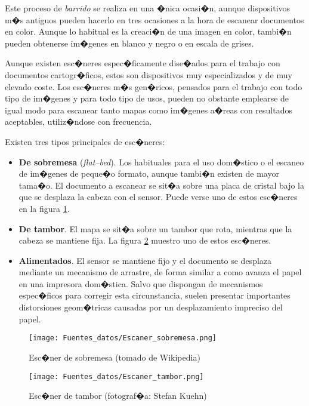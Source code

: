 Este proceso de \emph{barrido} se realiza en una �nica ocasi�n, aunque dispositivos m�s antiguos pueden hacerlo en tres ocasiones a la hora de escanear documentos en color. Aunque lo habitual es la creaci�n de una imagen en color, tambi�n  pueden obtenerse im�genes en blanco y negro o en escala de grises.

Aunque existen esc�neres espec�ficamente dise�ados para el trabajo con documentos cartogr�ficos, estos son dispositivos muy especializados y de muy elevado coste. Los esc�neres m�s gen�ricos, pensados para el trabajo con todo tipo de im�genes y para todo tipo de usos, pueden no obstante emplearse de igual modo para escanear tanto mapas como im�genes a�reas con resultados aceptables, utiliz�ndose con frecuencia.

Existen tres tipos principales de esc�neres:

\begin{itemize}
	\item \textbf{De sobremesa} (\emph{flat--bed}). Los habituales para el uso dom�stico o el escaneo de im�genes de peque�o formato, aunque tambi�n existen de mayor tama�o. El documento a escanear se sit�a sobre una placa de cristal bajo la que se desplaza la cabeza con el sensor. Puede verse uno de estos esc�neres en la figura \ref{Fig:Escaner_sobremesa}.
	\item \textbf{De tambor}. El mapa se sit�a sobre un tambor que rota, mientras que la cabeza se mantiene fija. La figura \ref{Fig:Escaner_tambor} muestro uno de estos esc�neres.
	\item \textbf{Alimentados}. El sensor se mantiene fijo y el documento se desplaza mediante un mecanismo de arrastre, de forma similar a como avanza el papel en una impresora dom�stica. Salvo que dispongan de mecanismos espec�ficos para corregir esta circunstancia, suelen presentar importantes distorsiones geom�tricas causadas por un desplazamiento impreciso del papel.
\end{itemize}

\begin{figure}[!hbt]   
\centering
\texttt{[image: Fuentes\_datos/Escaner\_sobremesa.png]}
\caption{\small Esc�ner de sobremesa (tomado de Wikipedia)}
\label{Fig:Escaner_sobremesa} 
\end{figure}

\begin{figure}[!hbt]   
\centering
\texttt{[image: Fuentes\_datos/Escaner\_tambor.png]}
\caption{\small Esc�ner de tambor (fotograf�a: Stefan Kuehn)}
\label{Fig:Escaner_tambor} 
\end{figure}

